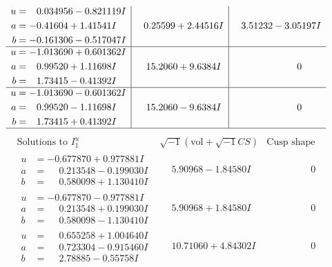 \documentclass[1p]{elsarticle_modified}
\theoremstyle{definition}
\newcommand{\I}{\sqrt{-1}}
\begin{document}
$$\begin{array}{c|c|c}
\begin{aligned}
u &= \phantom{-}0.034956 - 0.821119 I \\
a &= -0.41604 + 1.41541 I \\
b &= -0.161306 - 0.517047 I\end{aligned}
 & \phantom{-}0.25599 + 2.44516 I & \phantom{-}3.51232 - 3.05197 I \\ \hline\begin{aligned}
u &= -1.013690 + 0.601362 I \\
a &= \phantom{-}0.99520 + 1.11698 I \\
b &= \phantom{-}1.73415 - 0.41392 I\end{aligned}
 & \phantom{-}15.2060 + 9.6384 I & \phantom{-0.000000 } 0 \\ \hline\begin{aligned}
u &= -1.013690 - 0.601362 I \\
a &= \phantom{-}0.99520 - 1.11698 I \\
b &= \phantom{-}1.73415 + 0.41392 I\end{aligned}
 & \phantom{-}15.2060 - 9.6384 I & \phantom{-0.000000 } 0\\
 \hline 
 \end{array}$$\newpage$$\begin{array}{c|c|c}  
\text{Solutions to }I^u_{1}& \I (\text{vol} + \sqrt{-1}CS) & \text{Cusp shape}\\
 \hline 
\begin{aligned}
u &= -0.677870 + 0.977881 I \\
a &= \phantom{-}0.213548 - 0.199030 I \\
b &= \phantom{-}0.580098 + 1.130410 I\end{aligned}
 & \phantom{-}5.90968 - 1.84580 I & \phantom{-0.000000 } 0 \\ \hline\begin{aligned}
u &= -0.677870 - 0.977881 I \\
a &= \phantom{-}0.213548 + 0.199030 I \\
b &= \phantom{-}0.580098 - 1.130410 I\end{aligned}
 & \phantom{-}5.90968 + 1.84580 I & \phantom{-0.000000 } 0 \\ \hline\begin{aligned}
u &= \phantom{-}0.655258 + 1.004640 I \\
a &= \phantom{-}0.723304 - 0.915460 I \\
b &= \phantom{-}2.78885 - 0.55758 I\end{aligned}
 & \phantom{-}10.71060 + 4.84302 I & \phantom{-0.000000 } 0 \\ \hline\begin{aligned}

\end{aligned}
\end{array}$$
\end{document}
